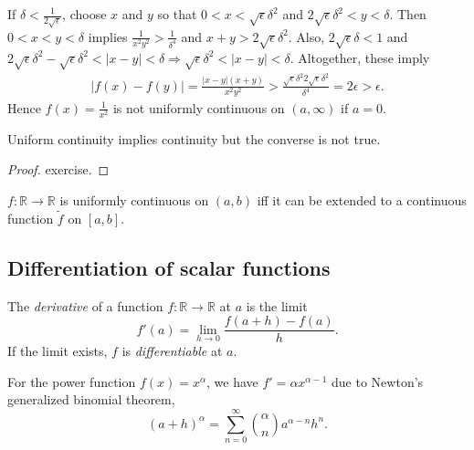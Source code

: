 \begin{solution}
If $\delta<\frac{1}{2\sqrt{\epsilon}}$,
 choose $x$ and $y$ so that $0<x<\sqrt{\epsilon}\delta^2$
 and $2\sqrt{\epsilon}\delta^2<y<\delta$.
Then $0<x<y<\delta$ implies $\frac{1}{x^2y^2}>\frac{1}{\delta^4}$
 and $x+y> 2\sqrt{\epsilon}\delta^2$.
Also, $2\sqrt{\epsilon}\delta<1$ and
 $2\sqrt{\epsilon}\delta^2-\sqrt{\epsilon}\delta^2<|x-y|<\delta \Rightarrow \sqrt{\epsilon}\delta^2<|x-y|<\delta$.
Altogether, these imply
\begin{align*}
|f(x)-f(y)| = \frac{|x-y|(x+y)}{x^2y^2}
> \frac{\sqrt{\epsilon}\delta^2 2\sqrt{\epsilon}\delta^2}{\delta^4}
=2\epsilon>\epsilon.
\end{align*}
Hence $f(x)=\frac{1}{x^2}$ is not uniformly continuous on $(a,\infty)$ if
$a=0$.
\end{solution}

\begin{thm}
  Uniform continuity implies continuity
   but the converse is not true.
\end{thm}
\begin{proof}
  exercise.
\end{proof}

\begin{thm}
  \label{thm:uniformContExtension}
  $f: \mathbb{R}\rightarrow \mathbb{R}$
  is uniformly continuous on $(a,b)$
  iff it can be extended
  to a continuous function $\tilde{f}$ on $[a,b]$.
\end{thm}


\subsection{Differentiation of scalar functions}
\label{sec:diff-funct}

\begin{defn}
  \label{def:derivative}
  The \emph{derivative}
   of a function $f: \mathbb{R}\rightarrow \mathbb{R}$
   at $a$ is the limit
   \begin{equation}
     \label{eq:derivative}
     f'(a)=\lim_{h\rightarrow 0} \frac{f(a+h)-f(a)}{h}.
   \end{equation}
  If the limit exists, $f$ is \emph{differentiable} at $a$.
\end{defn}

\begin{exm}
  For the power function \mbox{$f(x)=x^{\alpha}$}, 
   we have $f'=\alpha x^{\alpha-1}$
   due to
   Newton's generalized binomial theorem, 
  \begin{equation*}
    (a+h)^{\alpha}=\sum_{n=0}^{\infty}{\alpha \choose n}a^{\alpha-n}h^n.
  \end{equation*}
\end{exm}

